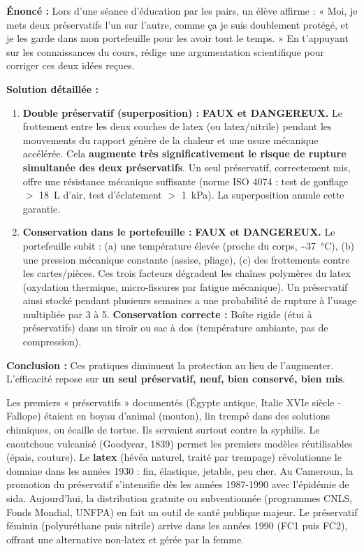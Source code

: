 \documentclass[11pt]{article}
\begin{document}
\begin{exoresolu}
\textbf{Énoncé :} Lors d'une séance d'éducation par les pairs, un élève affirme : « Moi, je mets deux préservatifs l'un sur l'autre, comme ça je suis doublement protégé, et je les garde dans mon portefeuille pour les avoir tout le temps. » En t'appuyant sur les connaissances du cours, rédige une argumentation scientifique pour corriger ces deux idées reçues.

\tcblower
\textbf{Solution détaillée :}
\begin{enumerate}
    \item \textbf{Double préservatif (superposition) :} \textbf{FAUX et DANGEREUX.} Le frottement entre les deux couches de latex (ou latex/nitrile) pendant les mouvements du rapport génère de la chaleur et une usure mécanique accélérée. Cela \textbf{augmente très significativement le risque de rupture simultanée des deux préservatifs}. Un seul préservatif, correctement mis, offre une résistance mécanique suffisante (norme ISO 4074 : test de gonflage $>$ \SI{18}{\liter} d'air, test d'éclatement $>$ \SI{1}{\kilo\pascal}). La superposition annule cette garantie.
    \item \textbf{Conservation dans le portefeuille :} \textbf{FAUX et DANGEREUX.} Le portefeuille subit : (a) une température élevée (proche du corps, \textasciitilde \SI{37}{\celsius}), (b) une pression mécanique constante (assise, pliage), (c) des frottements contre les cartes/pièces. Ces trois facteurs dégradent les chaînes polymères du latex (oxydation thermique, micro-fissures par fatigue mécanique). Un préservatif ainsi stocké pendant plusieurs semaines a une probabilité de rupture à l'usage multipliée par 3 à 5. \textbf{Conservation correcte :} Boîte rigide (étui à préservatifs) dans un tiroir ou sac à dos (température ambiante, pas de compression).
\end{enumerate}
\textbf{Conclusion :} Ces pratiques diminuent la protection au lieu de l'augmenter. L'efficacité repose sur \textbf{un seul préservatif, neuf, bien conservé, bien mis}.
\end{exoresolu}

\begin{savaistu}
Les premiers « préservatifs » documentés (Égypte antique, Italie XVIe siècle - Fallope) étaient en boyau d'animal (mouton), lin trempé dans des solutions chimiques, ou écaille de tortue. Ils servaient surtout contre la syphilis. Le caoutchouc vulcanisé (Goodyear, 1839) permet les premiers modèles réutilisables (épais, couture). Le \textbf{latex} (hévéa naturel, traité par trempage) révolutionne le domaine dans les années 1930 : fin, élastique, jetable, peu cher. Au Cameroun, la promotion du préservatif s'intensifie dès les années 1987-1990 avec l'épidémie de sida. Aujourd'hui, la distribution gratuite ou subventionnée (programmes CNLS, Fonds Mondial, UNFPA) en fait un outil de santé publique majeur. Le préservatif féminin (polyuréthane puis nitrile) arrive dans les années 1990 (FC1 puis FC2), offrant une alternative non-latex et gérée par la femme.
\end{savaistu}
\end{document}

